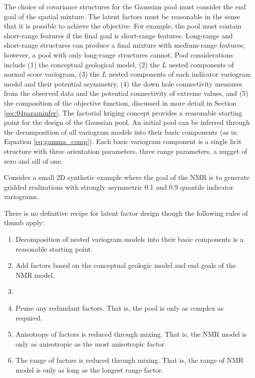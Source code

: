 The choice of covariance structures for the Gaussian pool must consider the end goal of the spatial mixture. The latent factors must be reasonable in the sense that it is possible to achieve the objective. For example, the pool must contain short-range features if the final goal is short-range features. Long-range and short-range structures can produce a final mixture with medium-range features; however, a pool with only long-range structures cannot. Pool considerations include (1) the conceptual geological model, (2) the $L$ nested components of normal score variogram, (3) the $L$ nested components of each indicator variogram model and their potential asymmetry, (4) the down hole connectivity measures from the observed data and the potential connectivity of extreme values, and (5) the composition of the objective function, discussed in more detail in Section \ref{sec:04paraminfer}. The factorial kriging concept provides a reasonable starting point for the design of the Gaussian pool. An initial pool can be inferred through the decomposition of all variogram models into their basic components (as in Equation \ref{eq:gamma_comp}). Each basic variogram component is a single licit structure with three orientation parameters, three range parameters, a nugget of zero and sill of one.

Consider a small \gls{2D} synthetic example where the goal of the \gls{NMR} is to generate gridded realizations with strongly asymmetric 0.1 and 0.9 quantile indicator variograms.

There is no definitive recipe for latent factor design though the following rules of thumb apply:
\begin{enumerate}[noitemsep]
    \item Decomposition of nested variogram models into their basic components   is a reasonable starting point.
    \item Add factors based on the conceptual geologic model and end goals of the \gls{NMR} model.
    \item
    \item Prune any redundant factors. That is, the pool is only as complex as required.
    \item Anisotropy of factors is reduced through mixing. That is, the \gls{NMR} model is only as anisotropic as the most anisotropic factor.
    \item The range of factors is reduced through mixing. That is, the range of \gls{NMR} model is only as long as the longest range factor.
\end{enumerate}





